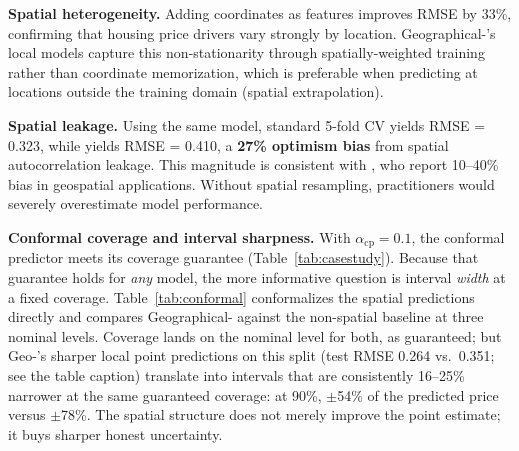 \documentclass[article]{jss}
\begin{document}
\textbf{Spatial heterogeneity.} Adding coordinates as features improves
 RMSE by 33\%, confirming that housing price drivers vary
strongly by location. Geographical-'s local models capture
this non-stationarity through spatially-weighted training rather than
coordinate memorization, which is preferable when predicting at locations
outside the training domain (spatial extrapolation).

\textbf{Spatial leakage.} Using the same  model, standard 5-fold
CV yields RMSE = 0.323, while  yields RMSE = 0.410, a
\textbf{27\% optimism bias} from spatial autocorrelation leakage. This
magnitude is consistent with \citet{Roberts2017}, who report 10--40\% bias in
geospatial applications. Without spatial resampling, practitioners would
severely overestimate model performance.

\textbf{Conformal coverage and interval sharpness.} With $\alpha_{\mathrm{cp}} = 0.1$, the
conformal predictor meets its coverage guarantee (Table~\ref{tab:casestudy}).
Because that guarantee holds for \emph{any} model, the more informative question
is interval \emph{width} at a fixed coverage. Table~\ref{tab:conformal}
conformalizes the spatial predictions directly and compares
Geographical- against the non-spatial  baseline at
three nominal levels. Coverage lands on the nominal level for both, as
guaranteed; but Geo-'s sharper local point predictions on this
split (test RMSE 0.264 vs.\ 0.351; see the table caption) translate into
intervals that are consistently 16--25\% narrower at the same guaranteed
coverage: at 90\%, $\pm$54\% of the predicted price versus $\pm$78\%. The
spatial structure does not merely improve the point estimate; it buys sharper
honest uncertainty.
\end{document}
